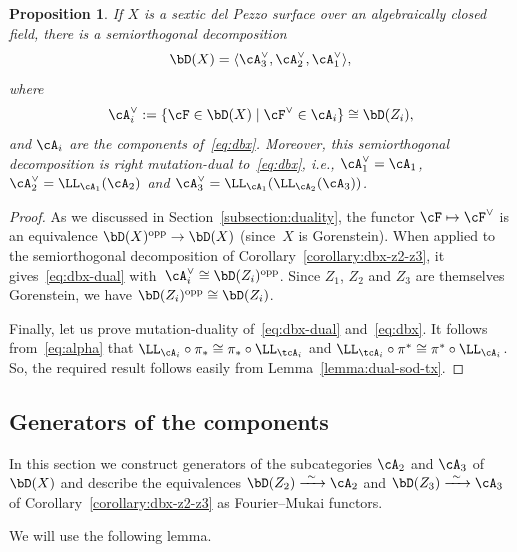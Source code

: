 \documentclass[11pt]{amsart}
\theoremstyle{plain}
\newtheorem{proposition}[theorem]{Proposition}
\theoremstyle{definition}
\theoremstyle{remark}
\begin{document}
\begin{proposition}\label{proposition:dbx-dual}
If $X$ is a sextic del Pezzo surface over an algebraically closed field, there is a semiorthogonal decomposition 
\begin{equation}
\label{eq:dbx-dual}
\bD(X) = \langle \cA_3^\vee, \cA_2^\vee, \cA_1^\vee \rangle,
\end{equation}
where
\begin{equation*}
\cA_i^\vee := \{ \cF \in \bD(X) \mid \cF^\vee \in \cA_i \} \cong \bD(Z_i),
\end{equation*}
and $\cA_i$ are the components of~\eqref{eq:dbx}.
Moreover, this semiorthogonal decomposition 
is right mutation-dual to~\eqref{eq:dbx}, i.e., $\cA_1^\vee = \cA_1$, $\cA_2^\vee = \LL_{\cA_1}(\cA_2)$ and $\cA_3^\vee = \LL_{\cA_1}(\LL_{\cA_2}(\cA_3))$.
\end{proposition}
\begin{proof}
As we discussed in Section~\ref{subsection:duality}, the functor $\cF \mapsto \cF^\vee$ is an equivalence $\bD(X)^{\mathrm{opp}} \to \bD(X)$ (since~$X$ is Gorenstein).
When applied to the semiorthogonal decomposition of Corollary~\ref{corollary:dbx-z2-z3}, it gives~\eqref{eq:dbx-dual} 
with~$\cA_i^\vee \cong \bD(Z_i)^{\mathrm{opp}}$.
Since $Z_1$, $Z_2$ and $Z_3$ are themselves Gorenstein, we have $\bD(Z_i)^{\mathrm{opp}} \cong \bD(Z_i)$.

Finally, let us prove mutation-duality of~\eqref{eq:dbx-dual} and~\eqref{eq:dbx}.
It follows from~\eqref{eq:alpha} that $\LL_{\cA_i} \circ \pi_* \cong \pi_* \circ \LL_{\tcA_i}$ and $\LL_{\tcA_i} \circ \pi^* \cong \pi^* \circ \LL_{\cA_i}$.
So, the required result follows easily from Lemma~\ref{lemma:dual-sod-tx}.
\end{proof}




\subsection{Generators of the components}

In this section we construct generators of the subcategories $\cA_2$ and $\cA_3$ of $\bD(X)$ 
and describe the equivalences $\bD(Z_2) \xrightarrow{\ \sim\ } \cA_2$ and $\bD(Z_3) \xrightarrow{\ \sim\ } \cA_3$ of Corollary~\ref{corollary:dbx-z2-z3} as Fourier--Mukai functors.


We will use the following lemma.
\end{document}
